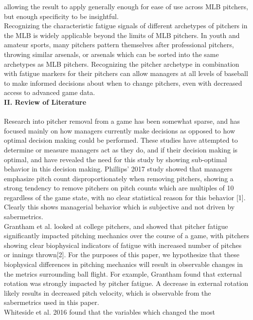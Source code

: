 \documentclass[12 pt]{article}
\begin{document}
allowing the result to apply generally enough for ease of use across MLB pitchers, 
but enough specificity to be insightful.
\\ \indent Recognizing the characteristic fatigue signals of different archetypes of 
pitchers in the MLB is widely applicable beyond the limits of MLB pitchers. In youth and 
amateur sports, many pitchers pattern themselves after professional pitchers, throwing similar 
arsenals, or arsenals which can be sorted into the same archetypes as MLB pitchers. 
Recognizing the pitcher archetype in combination with fatigue markers for their pitchers can allow 
managers at all levels of baseball to make informed decisions about when to change pitchers, 
even with decreased access to advanced game data. \\

\textbf{II. Review of Literature} \\ \\ 
\indent Research into pitcher removal from a game has been somewhat sparse, and has 
focused mainly on how managers currently make decisions as opposed to how optimal 
decision making could be performed. These studies have attempted to determine or measure 
managers act as they do, and if their decision making is optimal, and have revealed the
need for this study by showing sub-optimal behavior in this decision making. Phillips' 2017 
study showed that managers emphasize pitch count disproportionately when removing pitchers, 
showing a strong tendency to remove pitchers on pitch counts which are multiples of 
10 regardless of the game state, with no clear statistical reason for this behavior [1]. 
Clearly this shows managerial behavior which is subjective and not driven by sabermetrics. 
\\ \indent Grantham et al. looked at college pitchers, and showed that pitcher fatigue 
significantly impacted pitching mechanics over the course of a game, with pitchers showing 
clear biophysical indicators of fatigue with increased number of pitches or innings thrown[2]. 
For the purposes of this paper, we hypothesize that these biophysical differences in pitching mechanics
will result in observable changes in the metrics surrounding ball flight. For example, Grantham found that external rotation 
was strongly impacted by pitcher fatigue. A decrease in external rotation likely results in 
decreased pitch velocity, which is observable from the sabermetrics used in this paper.
\\ \indent Whiteside et al. 2016 found that the variables which changed the most 
\end{document}
